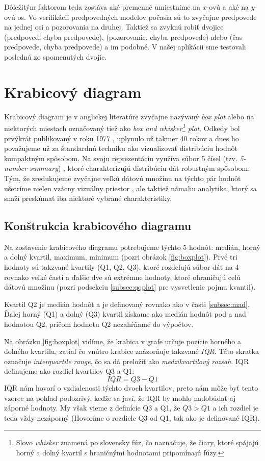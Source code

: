 Dôležitým faktorom teda zostáva aké premenné umiestnime na \mbox{$ x $-ovú} a aké na \mbox{$ y $-ovú} os. Vo verifikácii predpovedných modelov počasia sú to zvyčajne predpovede na jednej osi a pozorovania na druhej. Taktiež sa zvyknú robiť dvojice (predpoveď, chyba predpovede), (pozorovanie, chyba predpovede) alebo (čas predpovede, chyba predpovede) a im podobné. V našej aplikácii sme testovali poslednú zo spomenutých dvojíc.

\section{Krabicový diagram}
\label{sec:boxplot}
Krabicový diagram je v anglickej literatúre zvyčajne nazývaný \textit{box plot} alebo na niektorých miestach označovaný tiež ako \textit{box and whisker\footnote{Slovo \textit{whisker} znamená po slovensky fúz, čo naznačuje, že čiary, ktoré spájajú horný a dolný kvartil s hraničnými hodnotami pripomínajú fúzy.} plot}. Odkedy bol prvýkrát publikovaný v roku 1977 \cite{Tukey}, uplynulo už takmer 40 rokov a dnes ho považujeme už za štandardnú techniku ako vizualizovať distribúciu hodnôt kompaktným spôsobom. Na svoju reprezentáciu využíva súbor 5 čísel (tzv. \textit{\mbox{5-number} summary}) \cite{Potter}, ktoré charakterizujú distribúciu dát robustným spôsobom. Tým, že zredukujeme zvyčajne veľkú dátovú množinu na týchto pár hodnôt ušetríme nielen vzácny vizuálny priestor \cite{Wickham}, ale taktiež námahu analytika, ktorý sa snaží preskúmať iba niektoré vybrané charakteristiky. 

\subsection{Konštrukcia krabicového diagramu}

Na zostavenie krabicového diagramu potrebujeme týchto 5 hodnôt: medián, horný a dolný kvartil, maximum, minimum (pozri obrázok \ref{fig:boxplot}). Prvé tri hodnoty sú takzvané kvartily (Q1, Q2, Q3), ktoré rozdeľujú súbor dát na 4 rovnako veľké časti a ďalšie dve sú extrémne hodnoty, ktoré ohraničujú celú dátovú množinu (pozri podsekciu \ref{subsec:qqplot} pre vysvetlenie pojmu kvantil). 

Kvartil Q2 je medián hodnôt a je definovaný rovnako ako v časti \ref{subsec:mad}. Ďalej horný (Q1) a dolný (Q3) kvartil získame ako medián hodnôt pod a nad hodnotou Q2, pričom hodnotu Q2 nezahŕňame do výpočtov. 

Na obrázku \ref{fig:boxplot} vidíme, že krabica v grafe určuje pozície horného a dolného kvartilu, zatiaľ čo vnútro krabice znázorňuje takzvané \textit{IQR}. Táto skratka označuje \textit{interquartile range}, čo sa dá preložiť ako \textit{medzikvartilový rozsah}. IQR definujeme ako rozdiel kvartilov Q3 a Q1:
\[
IQR = Q3 - Q1
\]
IQR nám hovorí o vzdialenosti týchto dvoch kvartilov, preto nám môže byť tento vzorec na pohľad podozrivý, keďže sa javí, že IQR by mohlo nadobúdať aj záporné hodnoty. My však vieme z definície Q3 a Q1, že $ Q3 > Q1 $ a ich rozdiel je teda vždy nezáporný (Hovoríme o rozdiele Q3 od Q1, tak ako je definované IQR).


